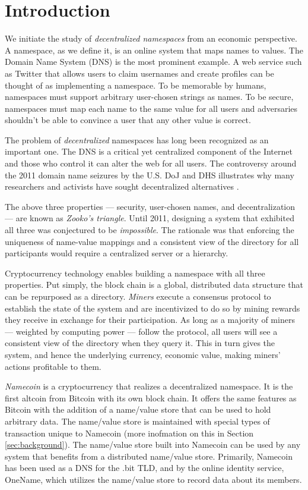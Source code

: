 \section{Introduction}
\label{sec:intro}

We initiate the study of {\em decentralized namespaces} from an economic perspective. A namespace, as we define it, is an online system that maps names to values. The Domain Name System (DNS) is the most prominent example.  A web service such as Twitter that allows users to claim usernames and create profiles can be thought of as implementing a namespace. To be memorable by humans, namespaces must support arbitrary user-chosen strings as names. To be secure, namespaces must map each name to the same value for all users and adversaries shouldn't be able to convince a user that any other value is correct.

The problem of {\em decentralized} namespaces has long been recognized as an important one. The DNS is a critical yet centralized component of the Internet and those who control it can alter the web for all users. The controversy around the 2011 domain name seizures by the U.S. DoJ and DHS illustrates why many researchers and activists have sought decentralized alternatives \cite{wikileaks}.

The above three properties --- security, user-chosen names, and decentralization --- are known as {\em Zooko's triangle}. Until 2011, designing a system that exhibited all three was conjectured to be {\em impossible}. The rationale was that enforcing the uniqueness of name-value mappings and a consistent view of the directory for all participants would require a centralized server or a hierarchy.

Cryptocurrency technology enables building a namespace with all three properties. Put simply, the block chain is a global, distributed data structure that can be repurposed as a directory. {\em Miners} execute a consensus protocol to establish the state of the system and are incentivized to do so by mining rewards they receive in exchange for their participation. As long as a majority of miners --- weighted by computing power --- follow the protocol, all users will see a consistent view of the directory when they query it. This in turn gives the system, and hence the underlying currency, economic value, making miners' actions profitable to them.

{\em Namecoin} is a cryptocurrency that realizes a decentralized namespace. It is the first altcoin from Bitcoin with its own block chain. It offers the same features as Bitcoin with the addition of a name/value store that can be used to hold arbitrary data. The name/value store is maintained with special types of transaction unique to Namecoin (more inofmation on this in Section \ref{sec:background}). The name/value store built into Namecoin can be used by any system that benefits from a distributed name/value store. Primarily, Namecoin has been used as a DNS for the .bit TLD, and by the online identity service, OneName, which utilizes the name/value store to record data about its members.

